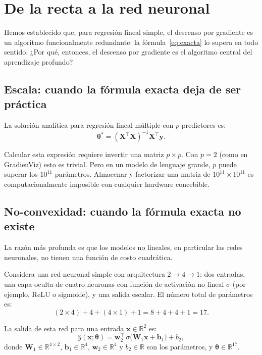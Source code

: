 \documentclass[12pt, a4paper]{article}
\newcommand{\R}{\mathbb{R}}
\newcommand{\T}{{\top}}
\begin{document}
\section{De la recta a la red neuronal}

Hemos establecido que, para regresión lineal simple, el descenso por gradiente
es un algoritmo funcionalmente redundante: la fórmula~\eqref{eq:exacta}
lo supera en todo sentido. ¿Por qué, entonces, el descenso por gradiente
es el algoritmo central del aprendizaje profundo?

\subsection{Escala: cuando la fórmula exacta deja de ser práctica}

La solución analítica para regresión lineal múltiple con $p$ predictores es:
\begin{equation}\label{eq:lsmulti}
  \boldsymbol{\theta}^* = (\mathbf{X}^\T \mathbf{X})^{-1}\mathbf{X}^\T \mathbf{y}.
\end{equation}

Calcular esta expresión requiere invertir una matriz $p \times p$.
Con $p = 2$ (como en GradienViz) esto es trivial.
Pero en un modelo de lenguaje grande, $p$ puede superar los $10^{11}$ parámetros.
Almacenar y factorizar una matriz de $10^{11} \times 10^{11}$ es computacionalmente
imposible con cualquier hardware concebible.

\subsection{No-convexidad: cuando la fórmula exacta no existe}

La razón más profunda es que los modelos no lineales, en particular las redes
neuronales, no tienen una función de costo cuadrática.

Considera una red neuronal simple con arquitectura $2 \to 4 \to 1$:
dos entradas, una capa oculta de cuatro neuronas con función de activación
no lineal $\sigma$ (por ejemplo, ReLU o sigmoide), y una salida escalar.
El número total de parámetros es:
\[
  (2 \times 4) + 4 + (4 \times 1) + 1 = 8 + 4 + 4 + 1 = 17.
\]

La salida de esta red para una entrada $\mathbf{x} \in \R^2$ es:
\[
  \hat{y}(\mathbf{x}; \boldsymbol{\theta}) =
    \mathbf{w}_2^\T\,\sigma\!\bigl(\mathbf{W}_1 \mathbf{x} + \mathbf{b}_1\bigr) + b_2,
\]
donde $\mathbf{W}_1 \in \R^{4\times 2}$, $\mathbf{b}_1 \in \R^4$, $\mathbf{w}_2 \in \R^4$
y $b_2 \in \R$ son los parámetros, y $\boldsymbol{\theta} \in \R^{17}$.
\end{document}

